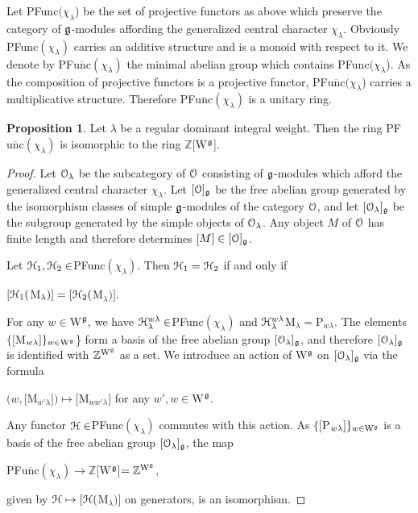 \documentclass[12pt]{amsart}
\theoremstyle{definition}\newtheorem{theorem}{Theorem}[section]
\newtheorem{proposition}{Proposition}[section]
\theoremstyle{definition}\newtheorem{definition}[proposition]{Definition}
\theoremstyle{remark}\newtheorem{example}[proposition]{Example}
\renewcommand{\to}[1][]{\xrightarrow{#1}}
\begin{document}
Let PFunc$(\chi_\lambda$) be the set of projective functors as above which preserve the category of $\frak g$-modules affording the generalized central character $\chi_\lambda$. Obviously PFunc$(\chi_\lambda)$ carries an additive structure and is a monoid with respect to it. We denote by PF$\overline{\mathrm{unc}}(\chi_\lambda)$ the minimal abelian group which contains PFunc$(\chi_\lambda$). As the composition of projective functors is a projective functor, PF$\overline{\mathrm{unc}}(\chi_\lambda$) carries a multiplicative structure. Therefore PF$\overline{\mathrm{unc}}(\chi_\lambda)$ is a unitary ring.
\begin{proposition}\label{Ppfsn}Let $\lambda$ be a regular dominant integral weight. Then the ring PF$\overline{\mathrm{unc}}(\chi_\lambda)$ is isomorphic to the ring $\mathbb Z[$W$^\frak g$].\end{proposition}
\begin{proof}Let $\EuScript O_\lambda$ be the subcategory of $\EuScript O$ consisting of $\frak g$-modules which afford the generalized central character $\chi_\lambda$. Let $[\EuScript O]_\frak g$ be the free abelian group generated by the isomorphism classes of simple $\frak g$-modules of the category $\EuScript O$, and let $[\EuScript O_\lambda]_\frak g$ be the subgroup generated by the simple objects of $\EuScript O_\lambda$. Any object $M$ of $\EuScript O$ has finite length and therefore determines [$M]\in [\EuScript O]_\frak g$.

Let $\EuScript H_1, \EuScript H_2\in$PFunc$(\chi_\lambda)$. Then $\EuScript H_1=\EuScript H_2$ if and only if \begin{center}$[\EuScript H_1($M$_\lambda)]=[\EuScript H_2($M$_\lambda)]$.\end{center} For any $w\in$W$^\frak g$, we have $\EuScript H_\lambda^{w\lambda}\in$PFunc$(\chi_\lambda)$ and $\EuScript H_\lambda^{w\lambda}$M$_\lambda=$P$_{w\lambda}$. The elements $\{[$M$_{w\lambda}]\}_{w\in\mathrm W^\frak g}$\} form a basis of the free abelian group $[\EuScript O_\lambda]_\frak g$, and therefore $[\EuScript O_\lambda]_\frak g$ is identified with $\mathbb Z^{\mathrm W^\frak g}$ as a set. We introduce an action of W$^\frak g$ on $[\EuScript O_\lambda]_\frak g$ via the formula\begin{center}$(w, [$M$_{w'\lambda}])\mapsto $[M$_{ww'\lambda}]$ for any $w', w\in$W$^\frak g$.\end{center}Any functor $\EuScript H\in$PFunc$(\chi_\lambda)$ commutes with this action. As $\{[$P$_{w\lambda}]\}_{w\in\mathrm W^\frak g}$ is a basis of the free abelian group $[\EuScript O_\lambda]_\frak g$, the map \begin{center}PF$\overline{\mathrm{unc}}(\chi_\lambda)\to\mathbb Z[$W$^\frak g$]$=\mathbb Z^{\mathrm W^\frak g}$,\end{center} given by $\EuScript H\mapsto{}{}[\EuScript H($M$_\lambda)]$ on generators, is an isomorphism.\end{proof}
\end{document}
